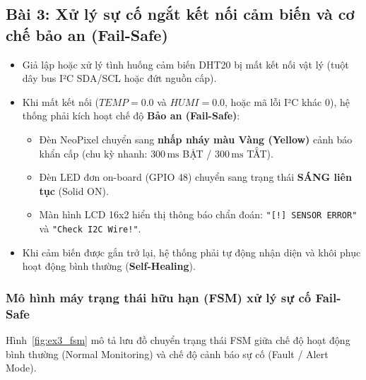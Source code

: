 \newpage
\subsection{Bài 3: Xử lý sự cố ngắt kết nối cảm biến và cơ chế bảo an (Fail-Safe)}

\begin{tcolorbox}[
    enhanced, colback=black!2, colframe=black!60, boxrule=1pt, arc=2.5mm, drop shadow,
    attach boxed title to top left={xshift=4mm, yshift=-3mm},
    boxed title style={enhanced, colback=black!85, colframe=black!85, boxrule=1pt, arc=2.5mm, drop shadow, left=6pt, right=6pt, top=2pt, bottom=2pt},
    title=\textcolor{white}{\large\textbf{Yêu cầu đề bài (Trích phiếu bài tập)}}
]
\bfseries
\vspace{0.2cm}
\begin{itemize}
    \item Giả lập hoặc xử lý tình huống cảm biến DHT20 bị mất kết nối vật lý (tuột dây bus I²C SDA/SCL hoặc đứt nguồn cấp).
    \item Khi mất kết nối ($TEMP = 0.0$ và $HUMI = 0.0$, hoặc mã lỗi I²C khác 0), hệ thống phải kích hoạt chế độ \textbf{Bảo an (Fail-Safe)}:
    \begin{itemize}
        \item Đèn NeoPixel chuyển sang \textbf{nhấp nháy màu Vàng (Yellow)} cảnh báo khẩn cấp (chu kỳ nhanh: $300\,\text{ms}$ BẬT / $300\,\text{ms}$ TẮT).
        \item Đèn LED đơn on-board (GPIO 48) chuyển sang trạng thái \textbf{SÁNG liên tục} (Solid ON).
        \item Màn hình LCD 16x2 hiển thị thông báo chẩn đoán: \texttt{"[!] SENSOR ERROR"} và \texttt{"Check I2C Wire!"}.
    \end{itemize}
    \item Khi cảm biến được gắn trở lại, hệ thống phải tự động nhận diện và khôi phục hoạt động bình thường (\textbf{Self-Healing}).
\end{itemize}
\end{tcolorbox}

\vspace{0.2cm}
\subsubsection{Mô hình máy trạng thái hữu hạn (FSM) xử lý sự cố Fail-Safe}
Hình~\ref{fig:ex3_fsm} mô tả lưu đồ chuyển trạng thái FSM giữa chế độ hoạt động bình thường (Normal Monitoring) và chế độ cảnh báo sự cố (Fault / Alert Mode).

